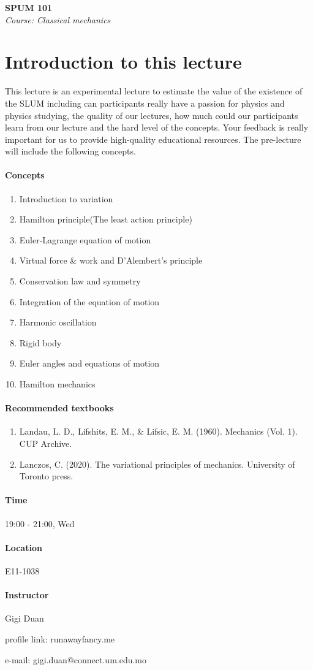 \documentclass[UTF8,a4paper,15pt,titlepage,scale=0.8]{article}%
\begin{document}
\begin{center}
    \large{\textbf{SPUM 101}} \\
    \textit{Course: Classical mechanics}
\end{center}

\section*{Introduction to this lecture}
This lecture is an experimental lecture to estimate the value of the existence of the SLUM including can participants really have a passion for physics and physics studying, the quality of our lectures, how much could our participants learn from our lecture and the hard level of the concepts. Your feedback is really important for us to provide high-quality educational resources. The pre-lecture will include the following concepts.
\paragraph{Concepts}
\begin{enumerate}[$\cdot$]
    \item Introduction to variation
    \item Hamilton principle(The least action principle)
    \item Euler-Lagrange equation of motion
    \item Virtual force \& work and D'Alembert's principle
    \item Conservation law and symmetry
    \item Integration of the equation of motion
    \item Harmonic oscillation
    \item Rigid body
    \item Euler angles and equations of motion
    \item Hamilton mechanics
\end{enumerate}
\paragraph{Recommended textbooks}
\begin{enumerate}[$\cdot$]
    \item Landau, L. D., Lifshits, E. M., \& Lifsic, E. M. (1960). Mechanics (Vol. 1). CUP Archive.
    \item Lanczos, C. (2020). The variational principles of mechanics. University of Toronto press.
\end{enumerate}

\paragraph{Time}
19:00 - 21:00, Wed

\paragraph{Location}
E11-1038

\paragraph{Instructor} 

Gigi Duan 

profile link: runawayfancy.me

e-mail: gigi.duan@connect.um.edu.mo
\end{document}
